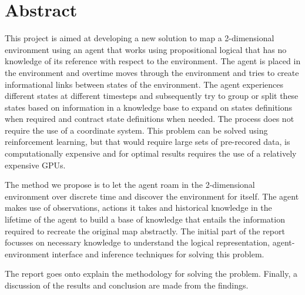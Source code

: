 \chapter{Abstract}

%
%

This project is aimed at developing a new solution to map a 2-dimensional environment using an agent that works using propositional logical that has no knowledge of its reference with respect to the environment. The agent is placed in the environment and overtime moves through the environment and tries to create informational links between states of the environment. The agent experiences different states at different timesteps and subsequently try to group or split these states based on information in a knowledge base to expand on states definitions when required and contract state definitions when needed.
The process does not require the use of a coordinate system. This problem can be solved using reinforcement learning, but that would require large sets of pre-recored data, is computationally expensive and for optimal results requires the use of a relatively expensive GPUs.

The method we propose is to let the agent roam in the 2-dimensional environment over discrete time and discover the environment for itself.
The agent makes use of observations, actions it takes and historical knowledge in the lifetime of the agent to build a base of knowledge that entails the information required to recreate the original map abstractly. The initial part of the report focusses on necessary knowledge to understand the logical representation, agent-environment interface and inference techniques for solving this problem. 

The report goes onto explain the methodology for solving the problem.
Finally, a discussion of the results and conclusion are made from the findings.

